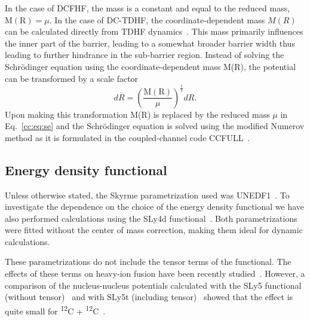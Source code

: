 In the case of DCFHF, the mass is a constant and equal to the reduced mass, $\mathrm{M(R)}=\mu$. 
In the case of DC-TDHF, the coordinate-dependent mass $M(R)$ can
be calculated directly from TDHF dynamics~\protect\citep{umar2009b}.
This mass primarily influences the inner part of the barrier, leading to a somewhat broader
barrier width thus leading to further hindrance in the sub-barrier region.
Instead of solving the Schr\"odinger equation using the coordinate-dependent mass M(R), the potential can be transformed by a scale factor~\protect\citep{umar2009b,goeke1983}
\begin{equation}
d\bar{R}=\left(\frac{\mathrm{M(R)}}{\mu}\right)^{\frac{1}{2}}dR.
\end{equation}
Upon making this transformation M(R) is replaced by the reduced mass $\mu$ in Eq.~\ref{cc:eq:se} and the Schr\"odinger equation is solved using the modified Numerov method as it is formulated in the coupled-channel code CCFULL~\protect\citep{hagino1999}.

\subsection{Energy density functional}

Unless otherwise stated, the Skyrme parametrization used was UNEDF1~\protect\citep{kortelainen2012}.
To investigate the dependence on the choice of the energy density functional we have also performed calculations using the SLy4d functional~\protect\citep{kim1997}. 
Both parametrizations were fitted without the center of mass correction, making them ideal for dynamic calculations.

These parametrizations do not include the tensor terms of the functional.
The effects of these terms on heavy-ion fusion have been recently studied~\protect\citep{dai2014a,stevenson2016,guo2018}.
However, a comparison of the nucleus-nucleus potentials calculated with the SLy5 functional (without tensor)~\protect\citep{chabanat1998a} and with SLy5t (including tensor)~\protect\citep{colo2007}  showed that the effect is quite small for \textsuperscript{12}C + \textsuperscript{12}C~\protect\citep{guo2018b}.

